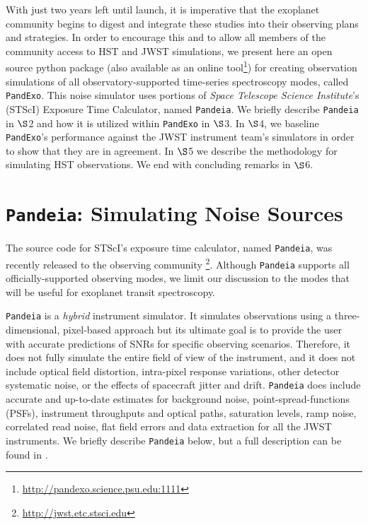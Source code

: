 \documentclass[iop]{emulateapj}
\begin{document}
With just two years left until launch, it is imperative that the exoplanet
community begins to digest and integrate these studies into their observing
plans and strategies. In order to encourage this and to allow all members of the
community access to HST and JWST simulations, we present here an open source python package (also available as an online tool\footnote{\url{http://pandexo.science.psu.edu:1111}})
for creating observation simulations of all observatory-supported time-series
spectroscopy modes, called \texttt{PandExo}.
This noise simulator uses portions of \emph{Space Telescope
Science Institute}'s (STScI) Exposure Time Calculator, named \texttt{Pandeia}. We briefly
describe \texttt{Pandeia} in $\S$2 and how it is utilized within \texttt{PandExo} in
$\S$3. In $\S$4, we baseline \texttt{PandExo}'s performance against the JWST instrument team's simulators in order to show that they are in agreement. In $\S$5 we describe the methodology for simulating HST observations. We end with concluding remarks in $\S$6. 

\section{\texttt{Pandeia}: Simulating Noise Sources}
The source code for STScI's exposure time calculator, named \texttt{Pandeia}, was recently released to the 
observing community \footnote{\url{http://jwst.etc.stsci.edu}}.
Although \texttt{Pandeia} supports all officially-supported observing
modes, we limit our discussion to the modes that will be useful
for exoplanet transit spectroscopy.

\texttt{Pandeia} is a \emph{hybrid} instrument simulator. It simulates observations 
using a three-dimensional, pixel-based approach but its ultimate goal is to 
provide the user with accurate predictions of SNRs for specific observing scenarios. 
Therefore, it does not fully simulate the entire field of view of the 
instrument, and it does not include optical field distortion, intra-pixel 
response variations,  other detector systematic noise, 
or the effects of spacecraft jitter and drift.  \texttt{Pandeia} does include
accurate and up-to-date estimates for background noise, point-spread-functions (PSFs),
instrument throughputs and optical paths, saturation levels, ramp noise, 
correlated read noise, flat field errors and data extraction for all the JWST instruments. We briefly describe \texttt{Pandeia} below, but a full description can be found in \citet{pon16}. 
\end{document}
